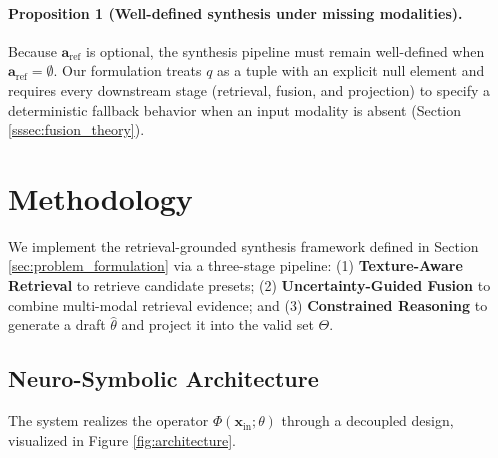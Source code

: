 \documentclass{article}
\begin{document}
\paragraph{Proposition 1 (Well-defined synthesis under missing modalities).}
Because $\mathbf{a}_{\text{ref}}$ is optional, the synthesis pipeline must remain well-defined when $\mathbf{a}_{\text{ref}}=\emptyset$. Our formulation treats $q$ as a tuple with an explicit null element and requires every downstream stage (retrieval, fusion, and projection) to specify a deterministic fallback behavior when an input modality is absent (Section \ref{sssec:fusion_theory}).

\section{Methodology}
\label{sec:methodology}

We implement the retrieval-grounded synthesis framework defined in Section \ref{sec:problem_formulation} via a three-stage pipeline: (1) \textbf{Texture-Aware Retrieval} to retrieve candidate presets; (2) \textbf{Uncertainty-Guided Fusion} to combine multi-modal retrieval evidence; and (3) \textbf{Constrained Reasoning} to generate a draft $\hat{\theta}$ and project it into the valid set $\Theta$.

\subsection{Neuro-Symbolic Architecture}
\label{ssec:architecture}

The system realizes the operator $\Phi(\mathbf{x}_{\text{in}}; \theta)$ through a decoupled design, visualized in Figure \ref{fig:architecture}.
\end{document}
